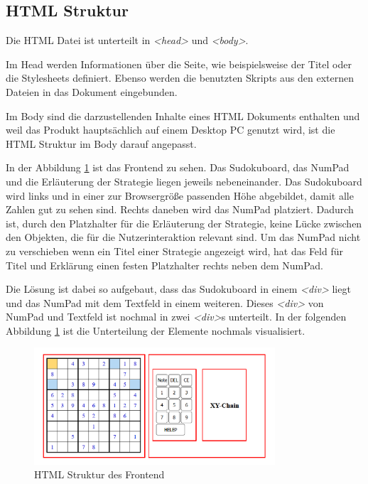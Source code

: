 \subsection{\ac{HTML} Struktur}
Die \ac{HTML} Datei ist unterteilt in \textit{<head>} und \textit{<body>}. 

Im Head werden Informationen über die Seite, wie beispielsweise der Titel oder die Stylesheets definiert. Ebenso werden die benutzten Skripts aus den externen Dateien in das Dokument eingebunden. 

Im Body sind die darzustellenden Inhalte eines \ac{HTML} Dokuments enthalten und weil das Produkt hauptsächlich auf einem Desktop PC genutzt wird, ist die \ac{HTML} Struktur im Body darauf angepasst.

In der Abbildung \ref{fig:AbbildungFrontend} ist das Frontend zu sehen. Das Sudokuboard, das NumPad und die Erläuterung der Strategie liegen jeweils nebeneinander. Das Sudokuboard wird links und in einer zur Browsergröße passenden Höhe abgebildet, damit alle Zahlen gut zu sehen sind. Rechts daneben wird das NumPad platziert. Dadurch ist, durch den Platzhalter für die Erläuterung der Strategie, keine Lücke zwischen den Objekten, die für die Nutzerinteraktion relevant sind. Um das NumPad nicht zu verschieben wenn ein Titel einer Strategie angezeigt wird, hat das Feld für Titel und Erklärung einen festen Platzhalter rechts neben dem NumPad.

Die Lösung ist dabei so aufgebaut, dass das Sudokuboard in einem \textit{<div>} liegt und das NumPad mit dem Textfeld in einem weiteren. Dieses \textit{<div>} von NumPad und Textfeld ist nochmal in zwei \textit{<div>}s unterteilt. In der folgenden Abbildung \ref{fig:AbbildungFrontend} ist die Unterteilung der Elemente nochmals visualisiert.

\begin{figure}[htbp]
	\centering
	\includegraphics[width=0.8\textwidth]{images/AbbildungFrontendRot.png}
	\caption{\ac{HTML} Struktur des Frontend}
	\label{fig:AbbildungFrontend}
\end{figure}

